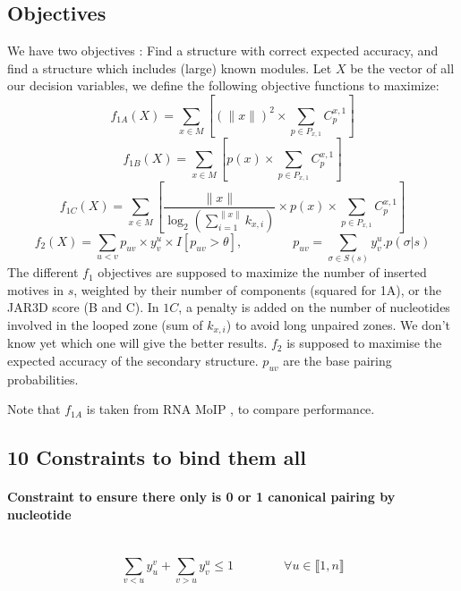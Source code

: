 \documentclass{article}
\begin{document}
\subsection{Objectives}
We have two objectives : Find a structure with correct expected accuracy, and find a structure which includes (large) known modules.
Let $X$ be the vector of all our decision variables, we define the following objective functions to maximize:
\[ f_{1A}(X) = \sum_{x \in M} \left[ (\|x\|)^2 \times \sum_{p \in P_{x,1}} C^{x,1}_p \right]\]
\[ f_{1B}(X) = \sum_{x \in M} \left[ p(x) \times \sum_{p \in P_{x,1}} C^{x,1}_p \right]\]
\[ f_{1C}(X) = \sum_{x \in M} \left[ \frac{\|x\|}{\log_2(\sum_{i=1}^{\|x\|}k_{x,i})} \times p(x) \times \sum_{p \in P_{x,1}} C^{x,1}_p \right]\]
$$ f_2(X) = \sum_{u<v} p_{uv}\times y^u_v \times I[p_{uv}>\theta], \qquad \qquad
p_{uv} = \sum_{\sigma \in S(s)} y^u_v.p(\sigma | s)$$
The different $f_1$ objectives are supposed to maximize the number of inserted motives in $s$, 
weighted by their number of components (squared for 1A), or the JAR3D score (B and C). 
In $1C$, a penalty is added on the number of nucleotides involved in the looped zone (sum of $k_{x,i}$) to avoid long unpaired zones. 
We don't know yet which one will give the better results.
$f_2$ is supposed to maximise the expected accuracy of the secondary structure. 
$p_{uv}$ are the base pairing probabilities.

Note that \(f_{1A}\) is taken from RNA MoIP \cite{reinharz_towards_2012}, to compare performance.

\subsection{10 Constraints to bind them all}
\paragraph{Constraint to ensure there only is 0 or 1 canonical pairing by nucleotide} ~ 
\begin{equation} \label{constraint:1}
	\sum_{v<u} y^v_u + \sum_{v>u} y^u_v \leq 1 \qquad\qquad \forall u \in \llbracket 1,n \rrbracket
\end{equation}
	
\end{document}
